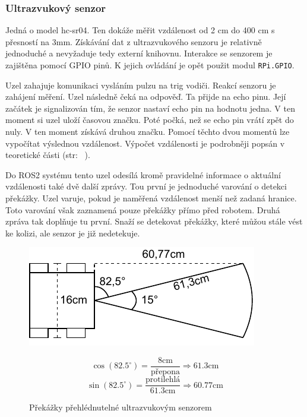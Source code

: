 \subsubsection*{Ultrazvukový senzor} \label{implementation:ultrasonic}
Jedná o model hc-sr04. Ten dokáže měřit vzdálenost od 2 cm do 400 cm s přesností na 3mm. Získávání dat z ultrazvukového senzoru je relativně jednoduché a nevyžaduje tedy externí knihovnu. Interakce se senzorem je zajištěna pomocí GPIO pinů. K jejich ovládání je opět použit modul \verb|RPi.GPIO|. 

Uzel zahajuje komunikaci vysláním pulzu na trig vodiči. Reakcí senzoru je zahájení měření. Uzel následně čeká na odpověď. Ta přijde na echo pinu. Její začátek je signalizován tím, že senzor nastaví echo pin na hodnotu jedna. V ten moment si uzel uloží časovou značku. Poté počká, než se echo pin vrátí zpět do nuly. V ten moment získává druhou značku. Pomocí těchto dvou momentů lze vypočítat výslednou vzdálenost. Výpočet vzdálenosti je podrobněji popsán v teoretické části (str:~ \pageref{theory:ultrasonic}).

Do ROS2 systému tento uzel odesílá kromě pravidelné informace o aktuální vzdálenosti také dvě další zprávy. Tou první je jednoduché varování o detekci překážky. Uzel varuje, pokud je naměřená vzdálenost menší než zadaná hranice. Toto varování však zaznamená pouze překážky přímo před robotem. Druhá zpráva tak doplňuje tu první. Snaží se detekovat překážky, které můžou stále vést ke kolizi, ale senzor je již nedetekuje. 

\begin{figure}[h!]
	\centering
	\begin{minipage}[c]{0.5\textwidth}
		\centering
		\includegraphics[scale=1.0]{obrazky-figures/ultrasonic_blind_spot.pdf}
	\end{minipage}%
	\begin{minipage}[c]{0.5\textwidth}
			$$\cos(82.5^\circ) = \frac{8\text{cm}}{\text{přepona}} \Rightarrow 61.3\text{cm}$$
			$$\sin(82.5^\circ) = \frac{\text{protilehlá}}{61.3\text{cm}} \Rightarrow 60.77\text{cm}$$
	\end{minipage}
	\caption{Překážky přehlédnutelné ultrazvukovým senzorem}
	\label{fig:ultrasonic_blind_spot}
\end{figure}

